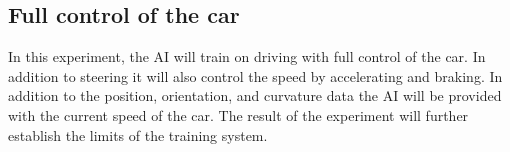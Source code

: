 




\subsection{Full control of the car}
In this experiment, the AI will train on driving with full control of the car. In addition to steering it will also control the speed by accelerating and braking. In addition to the position, orientation, and curvature data the AI will be provided with the current speed of the car. The result of the experiment will further establish the limits of the training system. 

